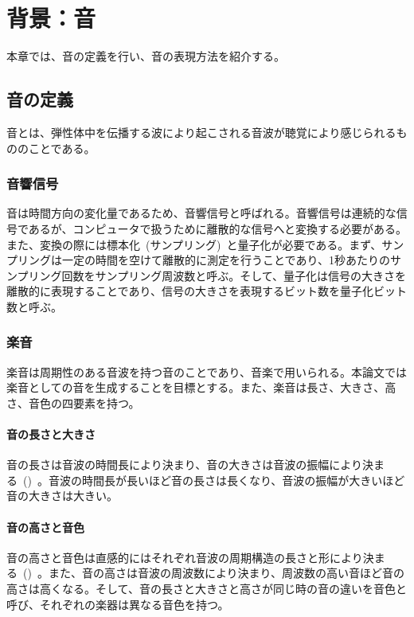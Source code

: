 \chapter{背景：音}

本章では、音の定義を行い、音の表現方法を紹介する。

\section{音の定義}

音とは、弾性体中を伝播する波により起こされる音波が聴覚により感じられるもののことである。

\subsection{音響信号}

音は時間方向の変化量であるため、音響信号と呼ばれる。音響信号は連続的な信号であるが、コンピュータで扱うために離散的な信号へと変換する必要がある。また、変換の際には標本化~(サンプリング)~と量子化が必要である。まず、サンプリングは一定の時間を空けて離散的に測定を行うことであり、1秒あたりのサンプリング回数をサンプリング周波数と呼ぶ。そして、量子化は信号の大きさを離散的に表現することであり、信号の大きさを表現するビット数を量子化ビット数と呼ぶ。

\subsection{楽音}

楽音は周期性のある音波を持つ音のことであり、音楽で用いられる。本論文では楽音としての音を生成することを目標とする。また、楽音は長さ、大きさ、高さ、音色の四要素を持つ。

\subsubsection{音の長さと大きさ}

音の長さは音波の時間長により決まり、音の大きさは音波の振幅により決まる~()~。音波の時間長が長いほど音の長さは長くなり、音波の振幅が大きいほど音の大きさは大きい。

\subsubsection{音の高さと音色}

音の高さと音色は直感的にはそれぞれ音波の周期構造の長さと形により決まる~()~。また、音の高さは音波の周波数により決まり、周波数の高い音ほど音の高さは高くなる。そして、音の長さと大きさと高さが同じ時の音の違いを音色と呼び、それぞれの楽器は異なる音色を持つ。

